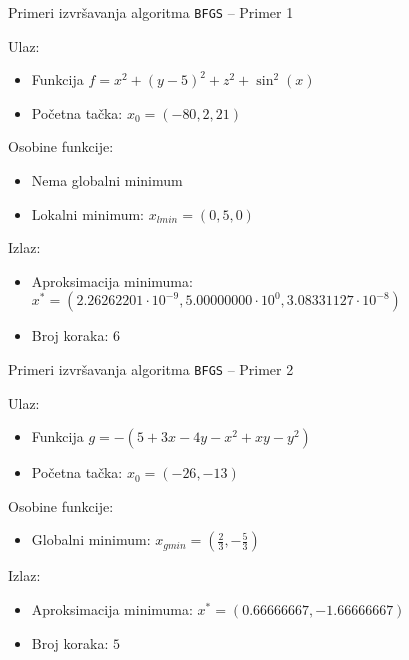 \documentclass[serbian]{beamer}
\begin{document}
\begin{frame}{Primeri izvr\v savanja algoritma \texttt{BFGS} -- Primer 1}

Ulaz:
\begin{itemize}
	\item Funkcija $f = x^2 + (y-5)^2 + z^2 + \sin^2(x)$
	\item Po\v cetna ta\v cka: $x_0 = (-80, 2, 21)$
\end{itemize}

Osobine funkcije:
\begin{itemize}
	\item Nema globalni minimum
	\item Lokalni minimum: $x_{lmin} = (0, 5, 0)$
\end{itemize}

Izlaz:
\begin{itemize}
	\item Aproksimacija minimuma: $x^* = (2.26262201\cdot 10^{-9}, 5.00000000\cdot 10^{0}, 3.08331127\cdot 10^{-8})$
	\item Broj koraka: $6$
\end{itemize}

\end{frame}

\begin{frame}{Primeri izvr\v savanja algoritma \texttt{BFGS} -- Primer 2}

Ulaz:
\begin{itemize}
	\item Funkcija $g = -(5 + 3x - 4y - x^2 + xy - y^2)$
	\item Po\v cetna ta\v cka: $x_0 = (-26, -13)$
\end{itemize}

Osobine funkcije:
\begin{itemize}
	\item Globalni minimum: $x_{gmin} = (\frac{2}{3}, -\frac{5}{3})$
\end{itemize}

Izlaz:
\begin{itemize}
	\item Aproksimacija minimuma: $x^* = (0.66666667, -1.66666667)$
	\item Broj koraka: $5$
\end{itemize}

\end{frame}
\end{document}
